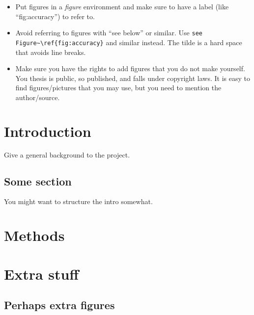 \documentclass[10pt, a4paper, two-sided,]{scrreport}
\begin{document}
\begin{itemize}
\item Put figures in a \emph{figure} environment and make sure to have a label (like ``fig:accuracy'') to refer to. 
\item Avoid referring to figures with ``see below'' or similar. Use \verb+see Figure~\ref{fig:accuracy}+ and similar instead. The tilde is a hard space that avoids line breaks.
\item Make sure you have the rights to add figures that you do not make yourself. You thesis is
  public, so published, and falls under copyright laws. It is easy to find figures/pictures that you
  may use, but you need to mention the author/source.
\end{itemize}



\chapter{Introduction}
\label{cha:introduction}

Give a general background to the project.


\section{Some section}
\label{sec:some-section}

You might want to structure the intro somewhat.




\lipsum[1-3]

\chapter{Methods}
\label{cha:methods}

\lipsum[4-5]


%
% 
\appendix

\chapter{Extra stuff}
\label{cha:extra-stuff}

\section{Perhaps extra figures}
\label{sec:perh-extra-figur}
\end{document}
